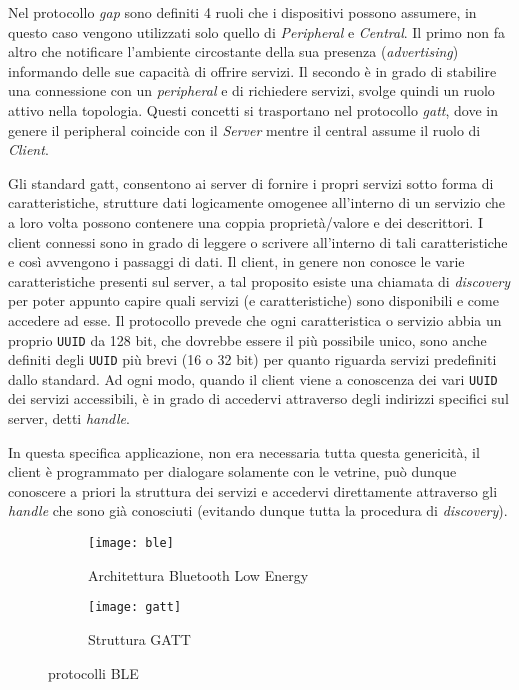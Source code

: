 Nel protocollo \textit{gap} sono definiti 4 ruoli che i dispositivi possono assumere, in questo caso vengono utilizzati solo quello di \textit{Peripheral} e \textit{Central}. Il primo non fa altro che notificare l'ambiente circostante della sua presenza (\textit{advertising}) informando delle sue capacit\`a di offrire servizi. Il secondo \`e in grado di stabilire una connessione con un \textit{peripheral} e di richiedere servizi, svolge quindi un ruolo attivo nella topologia. Questi concetti si trasportano nel protocollo \textit{gatt}, dove in genere il peripheral coincide con il \textit{Server} mentre il central assume il ruolo di \textit{Client}.

Gli standard gatt, consentono ai server di fornire i propri servizi sotto forma di caratteristiche, strutture dati logicamente omogenee all'interno di un servizio che a loro volta possono contenere una coppia propriet\`a/valore e dei descrittori. I client connessi sono in grado di leggere o scrivere all'interno di tali caratteristiche e cos\`i avvengono i passaggi di dati. Il client, in genere non conosce le varie caratteristiche presenti sul server, a tal proposito esiste una chiamata di \textit{discovery} per poter appunto capire quali servizi (e caratteristiche) sono disponibili e come accedere ad esse. Il protocollo prevede che ogni caratteristica o servizio abbia un proprio \texttt{UUID} da 128 bit, che dovrebbe essere il pi\`u possibile unico, sono anche definiti degli \texttt{UUID} pi\`u brevi (16 o 32 bit) per quanto riguarda servizi predefiniti dallo standard. Ad ogni modo, quando il client viene a conoscenza dei vari \texttt{UUID} dei servizi accessibili, \`e in grado di accedervi attraverso degli indirizzi specifici sul server, detti \textit{handle}.

In questa specifica applicazione, non era necessaria tutta questa genericit\`a, il client \`e programmato per dialogare solamente con le vetrine, pu\`o dunque conoscere a priori la struttura dei servizi e accedervi direttamente attraverso gli \textit{handle} che sono gi\`a conosciuti (evitando dunque tutta la procedura di \textit{discovery}).

\begin{figure}[ht]
  \center
  \begin{subfigure}{.65\textwidth}
    \texttt{[image: ble]}
    \caption{Architettura Bluetooth Low Energy}
  \end{subfigure}
  \hfill
  \begin{subfigure}{.25\textwidth}
    \texttt{[image: gatt]}
    \caption{Struttura GATT}
  \end{subfigure}
  \caption{protocolli BLE}
\end{figure}

